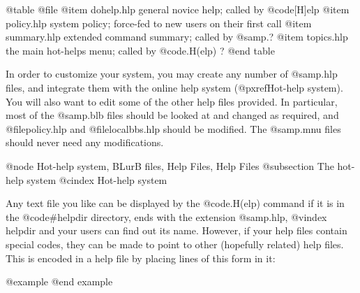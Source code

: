@table @file
@item dohelp.hlp
general novice help; called by @code{[H]elp}
@item policy.hlp
system policy; force-fed to new users on their first call
@item summary.hlp
extended command summary; called by @samp{.?}
@item topics.hlp
the main hot-helps menu; called by @code{.H(elp) ?}
@end table

In order to customize your system, you may create any number of @samp{.hlp}
files, and integrate them with the online help system
(@pxref{Hot-help system}).  You will also want to edit some of the other help
files provided.  In particular, most of the @samp{.blb} files should be
looked at and changed as required, and @file{policy.hlp} and
@file{localbbs.hlp} should be modified.  The @samp{.mnu} files should never
need any modifications.

@node Hot-help system, BLurB files, Help Files, Help Files
@subsection The hot-help system
@cindex Hot-help system

Any text file you like can be displayed by the @code{.H(elp)} command
if it is in the @code{#helpdir} directory, ends with the extension @samp{.hlp},
@vindex helpdir
and your users can find out its name.  However, if your help files
contain special codes,
they can be made to point to other (hopefully related) help files.
This is encoded in a help file by placing lines of this form in it:

@example
@end example

